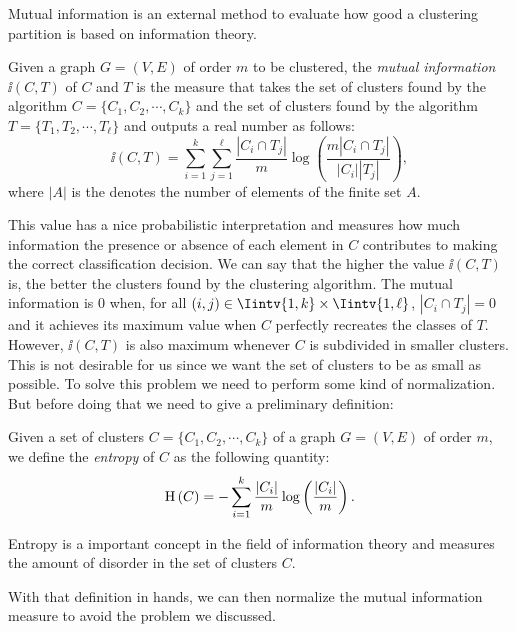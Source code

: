 Mutual information is an external method to evaluate how good a clustering partition is based on information theory.

\begin{definition}
   Given a graph $G = (V,E)$ of order $m$ to be clustered, the \textit{mutual information} $\ii (C, T)$ of $C$ and $T$ is the measure that takes the set of clusters found by the algorithm $C = \{ C_1, C_2, \cdots, C_k \}$ and the set of clusters found by the algorithm $T = \{ T_1, T_2, \cdots, T_\ell \}$ and outputs a real number as follows:
\begin{equation}
   \ii (C, T) = \sum_{i=1}^k \sum _{j=1}^\ell \frac{|C_i \cap T_j|}{m} \log \left( \frac{m |C_i \cap T_j|}{|C_i| |T_j|} \right),
\end{equation}
where $|A|$ is the denotes the number of elements of the finite set $A$.
\end{definition}

This value has a nice probabilistic interpretation and measures how much information the presence or absence of each element in $C$ contributes to making the correct classification decision. 
We can say that the higher the value $\ii (C, T)$ is, the better the clusters found by the clustering algorithm.
The mutual information is $0$ when, for all $(i,j) \in \Iintv{1,k} \times \Iintv{1,\ell}$, $|C_i \cap T_j| = 0$ and it achieves its maximum value when $C$ perfectly recreates the classes of $T$.
However, $\ii (C,T)$ is also maximum whenever $C$ is subdivided in smaller clusters.
This is not desirable for us since we want the set of clusters to be as small as possible.
To solve this problem we need to perform some kind of normalization.
But before doing that we need to give a preliminary definition:

\begin{definition}
   Given a set of clusters $C = \{C_1, C_2, \cdots, C_k \}$ of a graph $G=(V,E)$ of order $m$, we define the \textit{entropy} of $C$ as the following quantity:
\begin{equation}
   \operatorname{H\,} (C) = - \sum_{i=1}^k \frac{|C_i|}{m} \log \left( \frac{|C_i|}{m} \right) .
   \end{equation}
\end{definition}

Entropy is a important concept in the field of information theory and measures the amount of disorder in the set of clusters $C$.  

With that definition in hands, we can then normalize the mutual information measure to avoid the problem we discussed.

